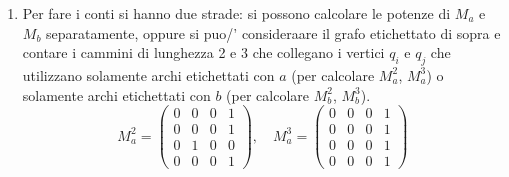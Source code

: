 \begin{ex}
\begin{sol}
\begin{enumerate}
    \item Per fare i conti si hanno due strade: 
    si possono calcolare le potenze di $M_a$ e $M_b$ separatamente,
    oppure si puo/' consideraare il grafo etichettato di sopra e contare 
    i cammini di lunghezza 2 e 3 che collegano i vertici $q_i$ e $q_j$ che utilizzano
    solamente archi etichettati con $a$ (per calcolare $M_a^2$, $M_a^3$)
    o solamente archi etichettati con $b$ (per calcolare $M_b^2$, $M_b^3$).
\[
M_a^2 =
\begin{pmatrix}
    0 & 0   & 0 & 1 \\
    0 & 0 & 0 & 1 \\
    0 & 1 & 0 & 0 \\
    0 & 0 & 0 & 1
\end{pmatrix}, \quad
M_a^3 =
\begin{pmatrix}
    0 & 0 & 0 & 1 \\
    0 & 0 & 0 & 1 \\
    0 & 0 & 0 & 1 \\
    0 & 0 & 0 & 1
\end{pmatrix}
\]


\end{enumerate}
\end{sol}
\end{ex}
